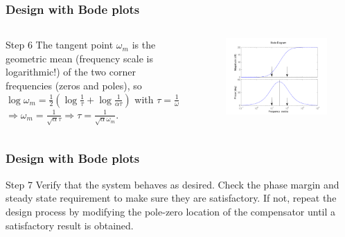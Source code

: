 \begin{frame}\frametitle{Design with Bode plots}

\begin{columns}
	\begin{column}{.49\textwidth}
		\begin{block}{Step 6}
		The tangent point $\omega_m$ is the geometric mean (frequency scale is logarithmic!) of the two corner frequencies (zeros and poles), so
		$ \log \omega_m = \frac{1}{2}(\log \frac{1}{\tau} + \log \frac{1}{\alpha\tau})$ with $\tau = \frac{1}{\omega}$
		\\ $\Rightarrow \omega_m = \frac{1}{\sqrt{\alpha}\tau} \Rightarrow \tau = \frac{1}{\sqrt{\alpha}\omega_m}$.
		\end{block} 
	\end{column}
	
	\begin{column}{.49\textwidth}
		\begin{figure}
			\centering
			\includegraphics[width=1
			\linewidth]{tangentpointpijlen}
		\end{figure}
	\end{column}
\end{columns}

\end{frame}

\begin{frame}
	\frametitle{Design with Bode plots}
	\begin{block}{Step 7}
		Verify that the system behaves as desired.
		Check the phase margin and steady state requirement to make sure they are satisfactory. If not, repeat the design process
		by modifying the pole-zero location of the compensator until a satisfactory result
		is obtained.
	\end{block}
\end{frame}

